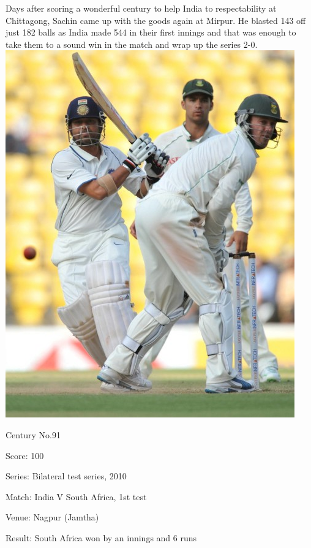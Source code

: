 \documentclass[11pt, a4paper]{article}
\begin{document}
Days after scoring a wonderful century to help India to respectability at Chittagong, Sachin came up with the goods again at Mirpur. He blasted 143 off just 182 balls as India made 544 in their first innings and that was enough to take them to a sound win in the match and wrap up the series 2-0.
\newpage
\includegraphics[height=0.8\textheight]{pics/91.jpg}

Century No.91 

Score: 100 

Series: Bilateral test series, 2010 

Match: India V South Africa, 1st test 

Venue: Nagpur (Jamtha) 

Result: South Africa won by an innings and 6 runs 
\end{document}
